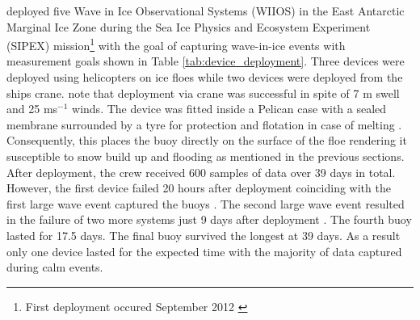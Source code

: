 \textcite{kohout2015device} deployed five Wave in Ice Observational Systems (WIIOS) in the East Antarctic Marginal Ice Zone during the Sea Ice Physics and Ecosystem Experiment (SIPEX) mission\footnote{First deployment occured September 2012 \cite{kohout2015device}} with the goal of capturing wave-in-ice events with measurement goals shown in Table \ref{tab:device_deployment}. Three devices were deployed using helicopters on ice floes while two devices were deployed from the ships crane. \textcite{kohout2015device}
note that deployment via crane was successful in spite of 7 m swell and 25 ms$^{-1}$ winds. The device was fitted inside a Pelican case with a sealed membrane surrounded by a tyre for protection and flotation in case of melting \cite{kohout2015device}. Consequently, this places the buoy directly on the surface of the floe rendering it susceptible to snow build up and flooding as mentioned in the previous sections.  After deployment, the crew received 600 samples of data over 39 days in total. However, the first device failed 20 hours after deployment coinciding with the first large wave event captured the buoys \cite{kohout2015device}. The second large wave event resulted in the failure of two more systems just 9 days after deployment \cite{kohout2015device}. The fourth buoy lasted for 17.5 days. The final buoy survived the longest at 39 days. As a result only one device lasted for the expected time with the majority of data captured during calm events.

